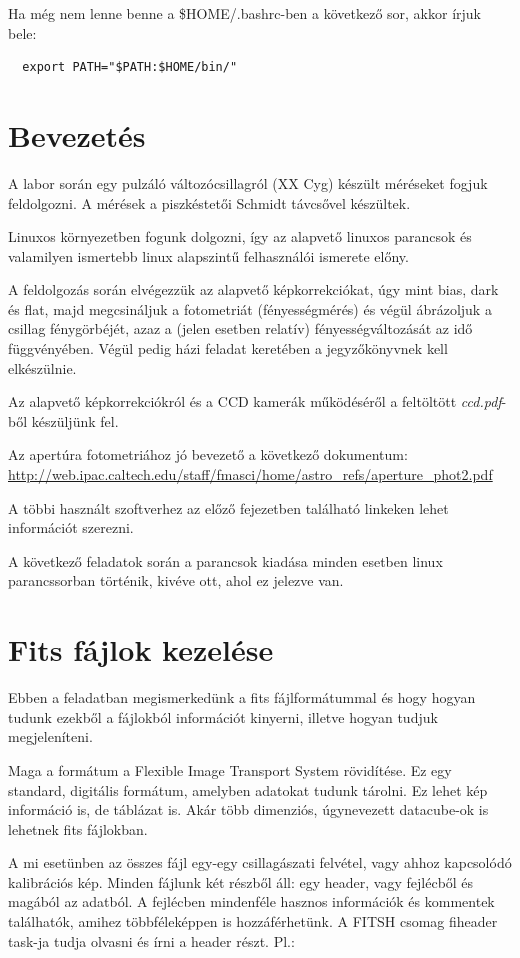 \documentclass{article}
\begin{document}
Ha még nem lenne benne a \$HOME/.bashrc-ben a következő sor, akkor írjuk bele:
\begin{verbatim}
  export PATH="$PATH:$HOME/bin/"
\end{verbatim}

\section{Bevezetés}

A labor során egy pulzáló változócsillagról (XX Cyg) készült méréseket fogjuk
feldolgozni. A mérések a piszkéstetői Schmidt távcsővel készültek.

Linuxos környezetben fogunk dolgozni, így az alapvető linuxos parancsok és
valamilyen ismertebb linux alapszintű felhasználói ismerete előny.

A feldolgozás során elvégezzük az alapvető képkorrekciókat, úgy mint bias, dark
és flat, majd megcsináljuk a fotometriát (fényességmérés) és végül ábrázoljuk a
csillag fénygörbéjét, azaz a (jelen esetben relatív) fényességváltozását az idő
függvényében.
Végül pedig házi feladat keretében a jegyzőkönyvnek kell elkészülnie.

Az alapvető képkorrekciókról és a CCD kamerák működéséről a feltöltött
{\it ccd.pdf}-ből készüljünk fel.

Az apertúra fotometriához jó bevezető a következő dokumentum:
\url{http://web.ipac.caltech.edu/staff/fmasci/home/astro_refs/aperture_phot2.pdf}

A többi használt szoftverhez az előző fejezetben található linkeken lehet
információt szerezni.

A következő feladatok során a parancsok kiadása minden esetben linux
parancssorban történik, kivéve ott, ahol ez jelezve van.

\section{Fits fájlok kezelése}

Ebben a feladatban megismerkedünk a fits fájlformátummal és hogy hogyan tudunk
ezekből a fájlokból információt kinyerni, illetve hogyan tudjuk megjeleníteni.

Maga a formátum a Flexible Image Transport System rövidítése. Ez egy standard,
digitális formátum, amelyben adatokat tudunk tárolni. Ez lehet kép információ
is, de táblázat is. Akár több dimenziós, úgynevezett datacube-ok is lehetnek
fits fájlokban.

A mi esetünben az összes fájl egy-egy csillagászati felvétel, vagy ahhoz
kapcsolódó kalibrációs kép.
Minden fájlunk két részből áll: egy header, vagy fejlécből és magából az
adatból. A fejlécben mindenféle hasznos információk és kommentek találhatók,
amihez többféleképpen is hozzáférhetünk.
A FITSH csomag fiheader task-ja tudja olvasni és írni a header részt.
Pl.:
\end{document}
